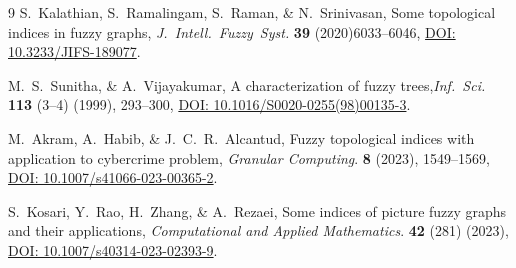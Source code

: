 \documentclass[12pt]{amsart}
\begin{document}
\begin{thebibliography}{9}
 S.~Kalathian, S.~Ramalingam, S.~Raman, \& N.~Srinivasan, Some topological indices in fuzzy graphs, {\it J.~Intell.~Fuzzy~Syst.} \textbf{39} (2020)6033--6046, \href{http://dx.doi.org/10.3233/JIFS-189077}{DOI: 10.3233/JIFS-189077}. 

M.~S.~Sunitha, \& A.~Vijayakumar, A characterization of fuzzy trees,{\it Inf.~Sci.}  \textbf{113} (3--4) (1999), 293--300, \href{https://doi.org/10.1016/S0020-0255(98)00135-3}{DOI: 10.1016/S0020-0255(98)00135-3}.


 M.~Akram, A.~Habib, \& J.~C.~R.~Alcantud, Fuzzy topological indices with application to cybercrime problem, \emph{Granular Computing}. \textbf{8} (2023),  1549--1569, \href{https://doi.org/10.1007/s41066-023-00365-2}{DOI: 10.1007/s41066-023-00365-2}.

S.~Kosari, Y.~Rao, H.~Zhang, \& A.~Rezaei, Some indices of picture fuzzy graphs and their applications, \emph{Computational and Applied Mathematics}. \textbf{42} (281) (2023), \href{https://doi.org/10.1007/s40314-023-02393-9}{DOI: 10.1007/s40314-023-02393-9}.




\end{thebibliography}
 
\end{document}
